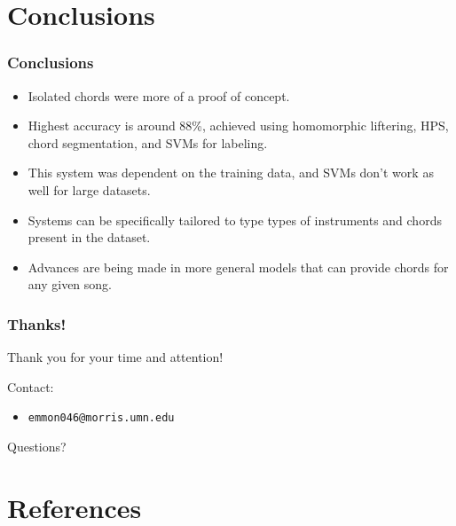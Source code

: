\documentclass{beamer}
\newcommand{\linespace}{\vskip 0.25cm}
\begin{document}
\section[Conclusions]{Conclusions}

\begin{frame}
	\frametitle{Conclusions}
	\begin{itemize}
		\item Isolated chords were more of a proof of concept.
		\item Highest accuracy is around 88\%, achieved using homomorphic liftering, HPS, chord segmentation, and SVMs for labeling.
		\item This system was dependent on the training data, and SVMs don't work as well for large datasets.
		\item Systems can be specifically tailored to type types of instruments and chords present in the dataset.
		\item Advances are being made in more general models that can provide chords for any given song.
	\end{itemize}
\end{frame}

\begin{frame}
	\frametitle{Thanks!}
	
	Thank you for your time and attention!
		
	\linespace
	\linespace
	
	Contact:  
	\begin{itemize}
		\item \texttt{emmon046@morris.umn.edu}
	\end{itemize}
	
	\linespace
	\linespace
	
	\begin{center}
	{\huge Questions?}
	\end{center}
\end{frame}

\section*{References}
\end{document}

